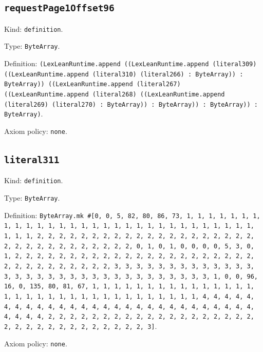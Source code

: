 \documentclass[11pt]{article}
\begin{document}
\subsection*{\texttt{requestPage1Offset96}}
\noindent Kind: \texttt{definition}.\par
\noindent Type: \texttt{ByteArray}.\par
\noindent Definition: \texttt{(LexLeanRuntime.append ((LexLeanRuntime.append (literal309) ((LexLeanRuntime.append (literal310) (literal266) : ByteArray)) : ByteArray)) ((LexLeanRuntime.append (literal267) ((LexLeanRuntime.append (literal268) ((LexLeanRuntime.append (literal269) (literal270) : ByteArray)) : ByteArray)) : ByteArray)) : ByteArray)}.\par
\noindent Axiom policy: \texttt{none}.\par
\subsection*{\texttt{literal311}}
\noindent Kind: \texttt{definition}.\par
\noindent Type: \texttt{ByteArray}.\par
\noindent Definition: \texttt{ByteArray.mk \#[0, 0, 5, 82, 80, 86, 73, 1, 1, 1, 1, 1, 1, 1, 1, 1, 1, 1, 1, 1, 1, 1, 1, 1, 1, 1, 1, 1, 1, 1, 1, 1, 1, 1, 1, 1, 1, 1, 1, 1, 2, 2, 2, 2, 2, 2, 2, 2, 2, 2, 2, 2, 2, 2, 2, 2, 2, 2, 2, 2, 2, 2, 2, 2, 2, 2, 2, 2, 2, 2, 2, 2, 0, 1, 0, 1, 0, 0, 0, 0, 5, 3, 0, 1, 2, 2, 2, 2, 2, 2, 2, 2, 2, 2, 2, 2, 2, 2, 2, 2, 2, 2, 2, 2, 2, 2, 2, 2, 2, 2, 2, 2, 2, 2, 2, 2, 3, 3, 3, 3, 3, 3, 3, 3, 3, 3, 3, 3, 3, 3, 3, 3, 3, 3, 3, 3, 3, 3, 3, 3, 3, 3, 3, 3, 3, 3, 3, 3, 1, 0, 0, 96, 16, 0, 135, 80, 81, 67, 1, 1, 1, 1, 1, 1, 1, 1, 1, 1, 1, 1, 1, 1, 1, 1, 1, 1, 1, 1, 1, 1, 1, 1, 1, 1, 1, 1, 1, 1, 1, 1, 1, 4, 4, 4, 4, 4, 4, 4, 4, 4, 4, 4, 4, 4, 4, 4, 4, 4, 4, 4, 4, 4, 4, 4, 4, 4, 4, 4, 4, 4, 4, 4, 4, 2, 2, 2, 2, 2, 2, 2, 2, 2, 2, 2, 2, 2, 2, 2, 2, 2, 2, 2, 2, 2, 2, 2, 2, 2, 2, 2, 2, 2, 2, 2, 2, 3]}.\par
\noindent Axiom policy: \texttt{none}.\par
\end{document}
